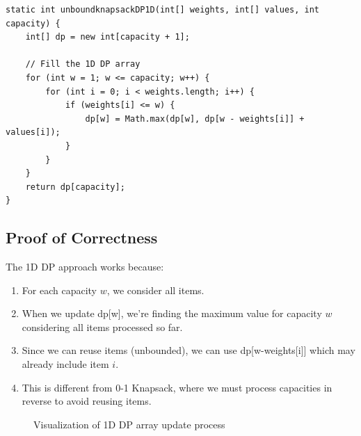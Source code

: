 \documentclass{article}
\begin{document}
\begin{lstlisting}[caption=1D DP Array Implementation]
static int unboundknapsackDP1D(int[] weights, int[] values, int capacity) {
    int[] dp = new int[capacity + 1];
    
    // Fill the 1D DP array
    for (int w = 1; w <= capacity; w++) {
        for (int i = 0; i < weights.length; i++) {
            if (weights[i] <= w) {
                dp[w] = Math.max(dp[w], dp[w - weights[i]] + values[i]);
            }
        }
    }
    return dp[capacity];
}
\end{lstlisting}

\subsection{Proof of Correctness}

\begin{tcolorbox}[notebox, title=Why 1D DP Works]
The 1D DP approach works because:

\begin{enumerate}
    \item For each capacity $w$, we consider all items.
    \item When we update dp[w], we're finding the maximum value for capacity $w$ considering all items processed so far.
    \item Since we can reuse items (unbounded), we can use dp[w-weights[i]] which may already include item $i$.
    \item This is different from 0-1 Knapsack, where we must process capacities in reverse to avoid reusing items.
\end{enumerate}
\end{tcolorbox}

\begin{figure}[h]
\centering
{}
\caption{Visualization of 1D DP array update process}
\end{figure}
\end{document}
